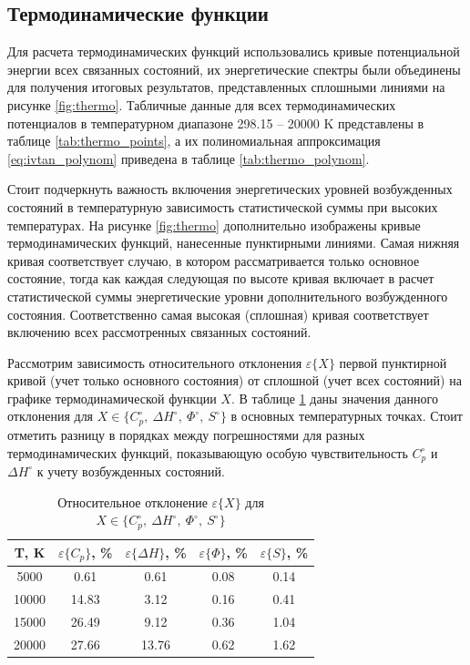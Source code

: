 \documentclass[12pt]{extarticle}
\begin{document}
    
    \subsection{Термодинамические функции}
    \label{sec:Chapter3.2}
    
    Для расчета термодинамических функций использовались кривые потенциальной энергии всех связанных состояний, их энергетические спектры были объединены для получения итоговых результатов, представленных сплошными линиями на рисунке \ref{fig:thermo}. Табличные данные для всех термодинамических потенциалов в температурном диапазоне 298.15 -- 20000 K представлены в таблице \ref{tab:thermo_points}, а их полиномиальная аппроксимация \ref{eq:ivtan_polynom} приведена в таблице \ref{tab:thermo_polynom}.
    
    Стоит подчеркнуть важность включения энергетических уровней возбужденных состояний в температурную зависимость статистической суммы при высоких температурах. На рисунке \ref{fig:thermo} дополнительно изображены кривые термодинамических функций, нанесенные пунктирными линиями. Самая нижняя кривая соответствует случаю, в котором рассматривается только основное состояние, тогда как каждая следующая по высоте кривая включает в расчет статистической суммы энергетические уровни дополнительного возбужденного состояния. Соответственно самая высокая (сплошная) кривая соответствует включению всех рассмотренных связанных состояний. 
    
    Рассмотрим зависимость относительного отклонения $\varepsilon\{X\}$ первой пунктирной кривой (учет только основного состояния) от сплошной (учет всех состояний) на графике термодинамической функции $X$. В таблице \ref{tab:epsilons} даны значения данного отклонения для $X \in \{ C_p^\circ,\ \Delta H^\circ,\ \Phi^\circ,\ S^\circ\}$ в основных температурных точках. Стоит отметить разницу в порядках между погрешностями для разных термодинамических функций, показывающую особую чувствительность $C_p^\circ$ и $\Delta H^\circ$ к учету возбужденных состояний.
    
    \begin{table}[H]
    	\centering
    	\caption{\label{tab:epsilons} Относительное отклонение $\varepsilon\{X\}$ для $X \in \{ C_p^\circ,\ \Delta H^\circ,\ \Phi^\circ,\ S^\circ\}$}
    	\begin{tabular}{|c|c|c|c|c|}
    		\hline
    		T, K     & $\varepsilon\{C_p\}$, \%    & $\varepsilon\{\Delta H\}$, \% & $\varepsilon\{ \Phi \}$, \% & $\varepsilon\{S\}$, \%    \\ \hline
    		5000  & 0.61  & 0.61   & 0.08 & 0.14 \\
    		10000 & 14.83 & 3.12   & 0.16 & 0.41 \\
    		15000 & 26.49 & 9.12   & 0.36 & 1.04 \\
    		20000 & 27.66 & 13.76  & 0.62 & 1.62 \\ \hline
    	\end{tabular}
    \end{table}
    
\end{document}
